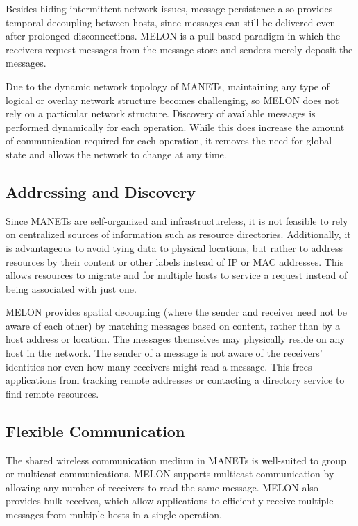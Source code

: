 Besides hiding intermittent network issues, message persistence also provides temporal decoupling between hosts, since messages can still be delivered even after prolonged disconnections. MELON is a pull-based paradigm in which the receivers request messages from the message store and senders merely deposit the messages.

Due to the dynamic network topology of MANETs, maintaining any type of logical or overlay network structure becomes challenging, so MELON does not rely on a particular network structure. Discovery of available messages is performed dynamically for each operation. While this does increase the amount of communication required for each operation, it removes the need for global state and allows the network to change at any time.

\subsection{Addressing and Discovery}

Since MANETs are self-organized and infrastructureless, it is not feasible to rely on centralized sources of information such as resource directories. Additionally, it is advantageous to avoid tying data to physical locations, but rather to address resources by their content or other labels instead of IP or MAC addresses. This allows resources to migrate and for multiple hosts to service a request instead of being associated with just one.

MELON provides spatial decoupling (where the sender and receiver need not be aware of each other) by matching messages based on content, rather than by a host address or location. The messages themselves may physically reside on any host in the network. The sender of a message is not aware of the receivers' identities nor even how many receivers might read a message. This frees applications from tracking remote addresses or contacting a directory service to find remote resources.

\subsection{Flexible Communication}

The shared wireless communication medium in MANETs is well-suited to group or multicast communications. MELON supports multicast communication by allowing any number of receivers to read the same message. MELON also provides bulk receives, which allow applications to efficiently receive multiple messages from multiple hosts in a single operation.

